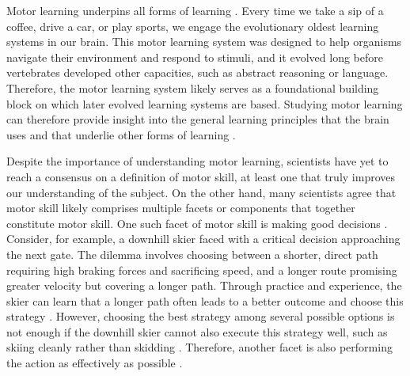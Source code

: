 Motor learning underpins all forms of learning \cite{shadmehr_computational_2004}. Every time we take a sip of a coffee, drive a car, or play sports, we engage the evolutionary oldest learning systems in our brain. This motor learning system was designed to help organisms navigate their environment and respond to stimuli, and it evolved long before vertebrates developed other capacities, such as abstract reasoning or language. Therefore, the motor learning system likely serves as a foundational building block on which later evolved learning systems are based. Studying motor learning can therefore provide insight into the general learning principles that the brain uses and that underlie other forms of learning \cite{shadmehr_computational_2004}.

Despite the importance of understanding motor learning, scientists have yet to reach a consensus on a definition of motor skill, at least one that truly improves our understanding of the subject\cite{du_relationship_2022, shadmehr_computational_2004}. On the other hand, many scientists agree that motor skill likely comprises multiple facets or components that together constitute motor skill\cite{wolpert_principles_2011, wolpert_motor_2010, wolpert_perspectives_2001, du_relationship_2022, chen_effects_2018, diedrichsen_motor_2015, stanley_motor_2013, gallivan_decision-making_2018, krakauer_motor_2019, makino_circuit_2016}. One such facet of motor skill is making good decisions \cite{gallivan_decision-making_2018, du_relationship_2022, wolpert_motor_2010}. Consider, for example, a downhill skier faced with a critical decision approaching the next gate. The dilemma involves choosing between a shorter, direct path requiring high braking forces and sacrificing speed, and a longer route promising greater velocity but covering a longer path. Through practice and experience, the skier can learn that a longer path often leads to a better outcome and choose this strategy \cite{supej_differential_2008, lesnik_best_2007, federolf_quantifying_2012}. However, choosing the best strategy among several possible options is not enough if the downhill skier cannot also execute this strategy well, such as skiing cleanly rather than skidding \cite{reid_kinematic_2010, reid_turn_2009}. Therefore, another facet is also performing the action as effectively as possible \cite{du_relationship_2022, wolpert_perspectives_2001}.

